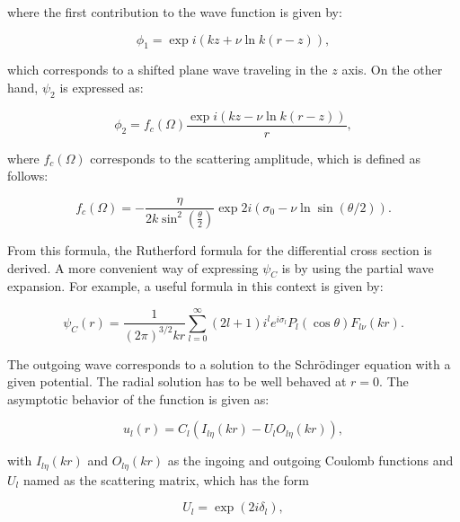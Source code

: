 \documentclass[openany]{book}
\begin{document}
where the first contribution to the wave function is given by:

\begin{equation}\label{rmatrix_coulombPsi_asymptotics_1}
	\phi_1 = \exp {i (kz + \nu 	\ln {k(r-z)}) },
\end{equation}

which corresponds to a shifted plane wave traveling in the $z$ axis. On the other hand, $\psi_2$ is expressed as: 

\begin{equation}\label{rmatrix_coulombPsi_asymptotics_2}
	\phi_2 = f_c(\Omega) \frac{\exp {i (kz - \nu 	\ln {k(r-z)}) }}{r},
\end{equation}

where $f_c(\Omega)$ corresponds to the scattering amplitude, which is defined as follows: 

\begin{equation}\label{rmatrix_coulombPsi_scatteringAmplitude}
	f_c(\Omega) = - \frac{\eta}{2k\sin^2 \left(\frac{\theta}{2}\right)} \exp{ 2i \left(\sigma_0 - \nu \ln \sin (\theta /2)\right)}.
\end{equation}

From this formula, the Rutherford formula for the differential cross section is derived. A more convenient way of expressing $\psi_C$ is by using the partial wave expansion. For example, a useful formula in this context is given by: 

\begin{equation}\label{rmatrix_coulombPsi_partialWaves}
	\psi_C(r) = \frac{1}{(2\pi)^{3/2}kr} \sum_{l=0}^{\infty} { (2l + 1) i^l e^{i\sigma_l} P_l(\cos \theta) F_{l\nu} (kr)}.
\end{equation}

The outgoing wave corresponds to a solution to the Schrödinger equation with a given potential. The radial solution has to be well behaved at $r = 0$. The asymptotic behavior of the function is given as: 

\begin{equation}\label{rmatrix_coulombPsi_u_asymptotics}
	u_l(r) = C_l (I_{l\eta}(kr) - U_lO_{l\eta}(kr)),
\end{equation}

with $I_{l\eta}(kr)$ and $O_{l\eta}(kr)$ as the ingoing and outgoing Coulomb functions and $U_l$ named as the scattering matrix, which has the form 

\begin{equation}\label{rmatrix_coulombPsi_collision}
	U_l = \exp {(2i\delta_l)},
\end{equation}
\end{document}
